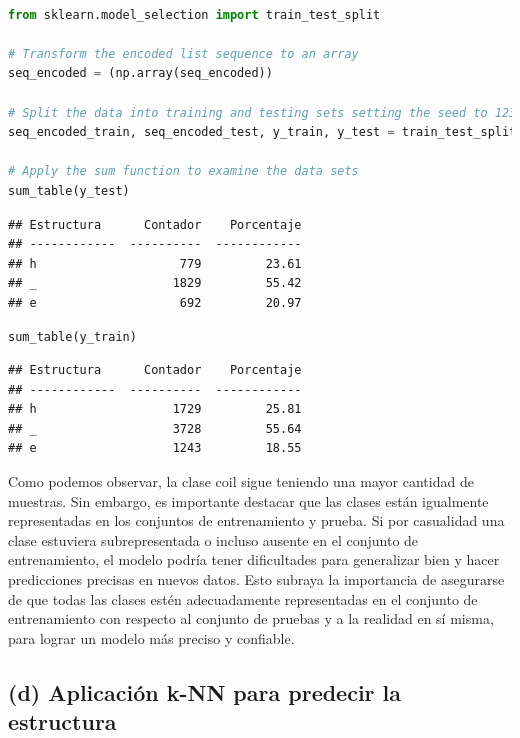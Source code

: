 \documentclass[
]{article}
\begin{document}
\begin{lstlisting}[language=Python]

from sklearn.model_selection import train_test_split

# Transform the encoded list sequence to an array
seq_encoded = (np.array(seq_encoded))

# Split the data into training and testing sets setting the seed to 123
seq_encoded_train, seq_encoded_test, y_train, y_test = train_test_split(seq_encoded, y ,test_size=0.33,  random_state=123)

# Apply the sum function to examine the data sets
sum_table(y_test)
\end{lstlisting}

\begin{lstlisting}
## Estructura      Contador    Porcentaje
## ------------  ----------  ------------
## h                    779         23.61
## _                   1829         55.42
## e                    692         20.97
\end{lstlisting}

\begin{lstlisting}[language=Python]
sum_table(y_train)
\end{lstlisting}

\begin{lstlisting}
## Estructura      Contador    Porcentaje
## ------------  ----------  ------------
## h                   1729         25.81
## _                   3728         55.64
## e                   1243         18.55
\end{lstlisting}

Como podemos observar, la clase coil sigue teniendo una mayor cantidad
de muestras. Sin embargo, es importante destacar que las clases están
igualmente representadas en los conjuntos de entrenamiento y prueba. Si
por casualidad una clase estuviera subrepresentada o incluso ausente en
el conjunto de entrenamiento, el modelo podría tener dificultades para
generalizar bien y hacer predicciones precisas en nuevos datos. Esto
subraya la importancia de asegurarse de que todas las clases estén
adecuadamente representadas en el conjunto de entrenamiento con respecto
al conjunto de pruebas y a la realidad en sí misma, para lograr un
modelo más preciso y confiable.

\hypertarget{d-aplicaciuxf3n-k-nn-para-predecir-la-estructura}{%
\subsection{(d) Aplicación k-NN para predecir la
estructura}\label{d-aplicaciuxf3n-k-nn-para-predecir-la-estructura}}
\end{document}
